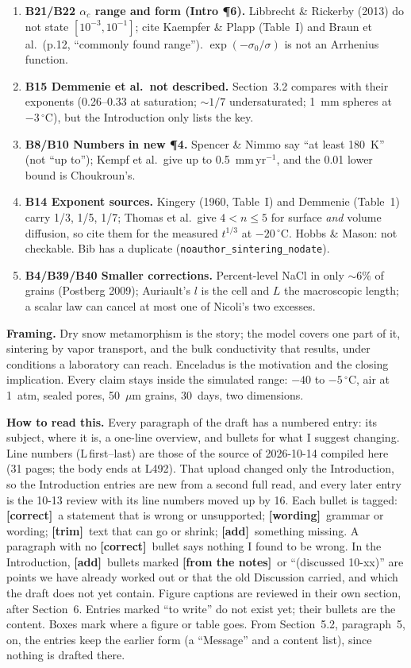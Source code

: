 \documentclass[11pt]{article}
\newcommand{\Note}{\textcolor{open}{\textbf{[from the notes]}}\ }
\newcommand{\tC}{\textcolor{miss}{\textbf{[correct]}}\ }
\newcommand{\tG}{\textcolor{stale}{\textbf{[wording]}}\ }
\newcommand{\tT}{\textcolor{cut}{\textbf{[trim]}}\ }
\newcommand{\tA}{\textcolor{have}{\textbf{[add]}}\ }
\newcommand{\add}[1]{\textcolor{revB}{#1}}
\begin{document}
\begin{enumerate}
{  (an experiment with no model); and it is exact only for a kinetics-limited model (Legagneux \& Domin\'e 2005, p.10).}
\item \add{\textbf{B21/B22 $\alpha_c$ range and form (Intro \P6).} Libbrecht \& Rickerby (2013) do not state
  $[10^{-3},10^{-1}]$; cite Kaempfer \& Plapp (Table~I) and Braun et al.\ (p.12, ``commonly found range''). $\exp(-\sigma_0/\sigma)$
  is not an Arrhenius function.}
\item \add{\textbf{B15 Demmenie et al.\ not described.} Section~3.2 compares with their exponents (0.26--0.33 at saturation;
  $\sim1/7$ undersaturated; 1~mm spheres at $-3\,^{\circ}$C), but the Introduction only lists the key.}
\item \add{\textbf{B8/B10 Numbers in new \P4.} Spencer \& Nimmo say ``at least 180~K'' (not ``up to''); Kempf et al.\ give
  up to 0.5~mm\,yr$^{-1}$, and the 0.01 lower bound is Choukroun's.}
\item \add{\textbf{B14 Exponent sources.} Kingery (1960, Table~I) and Demmenie (Table~1) carry 1/3, 1/5, 1/7; Thomas et al.\
  give $4<n\le5$ for surface \emph{and} volume diffusion, so cite them for the measured $t^{1/3}$ at $-20\,^{\circ}$C. Hobbs \&
  Mason: not checkable. Bib has a duplicate (\texttt{noauthor\_sintering\_nodate}).}
\item \add{\textbf{B4/B39/B40 Smaller corrections.} Percent-level NaCl in only $\sim$6\% of grains (Postberg 2009); Auriault's
  $l$ is the cell and $L$ the macroscopic length; a scalar law can cancel at most one of Nicoli's two excesses.}
\end{enumerate}

\textbf{Framing.} Dry snow metamorphism is the story; the model covers one
part of it, sintering by vapor transport, and the bulk conductivity that
results, under conditions a laboratory can reach. Enceladus is the motivation
and the closing implication. Every claim stays inside the simulated range:
$-40$ to $-5\,^{\circ}$C, air at 1~atm, sealed pores, 50~$\mu$m grains,
30~days, two dimensions.

\textbf{How to read this.} Every paragraph of the draft has a numbered
entry: its subject, where it is, a one-line overview, and bullets for what I
suggest changing. Line numbers (L\,first--last) are those of the source of
2026-10-14 compiled here (31 pages; the body ends at L492). That upload
changed only the Introduction, so the Introduction entries are new from a
second full read, and every later entry is the 10-13 review with its line
numbers moved up by 16. Each bullet is tagged:
\tC a statement that is wrong or unsupported;
\tG grammar or wording;
\tT text that can go or shrink;
\tA something missing.
A paragraph with no \tC bullet says nothing I found to be wrong. In the
Introduction, \tA bullets marked \Note or ``(discussed 10-xx)'' are points we
have already worked out or that the old Discussion carried, and which the
draft does not yet contain. Figure captions are reviewed in their own
section, after Section~6. Entries
marked ``to write'' do not exist yet; their bullets are the content. Boxes
mark where a figure or table goes. From Section~5.2, paragraph~5, on, the
entries keep the earlier form (a ``Message'' and a content list), since
nothing is drafted there.
\end{document}
